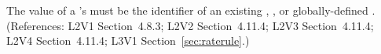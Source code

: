 The value of a \RateRule's  must be the identifier
of an existing \Compartment, \Species, or globally-defined \Parameter.
(References: L2V1 Section~4.8.3; L2V2 Section~4.11.4; L2V3
Section~4.11.4; L2V4 Section~4.11.4; L3V1 Section~\ref{sec:raterule}.)
